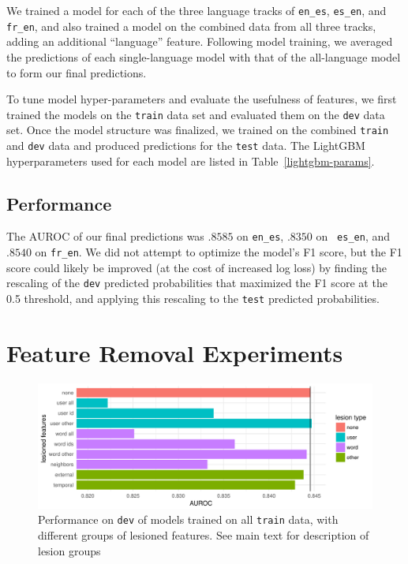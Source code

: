 \documentclass[11pt,a4paper]{article}
\begin{document}
We trained a model for each of the three language tracks of {\tt en\_es}, {\tt es\_en},
and {\tt fr\_en}, and also trained a model on the combined data from
all three tracks, adding an additional ``language'' feature. Following model
training, we averaged the predictions of each single-language model with that of
the all-language model to form our final predictions.

To tune model hyper-parameters and evaluate the usefulness of features, we first
trained the models on the {\tt train} data set and evaluated them on the {\tt dev}
data set. Once the model structure was finalized, we trained on the combined
{\tt train} and {\tt dev} data and produced predictions for the {\tt test} data. The
LightGBM hyperparameters used for each model are listed in Table~\ref{lightgbm-params}.



\subsection{Performance}

The AUROC of our final predictions was $.8585$ on {\tt en\_es}, $.8350$ on {\tt
  es\_en}, and $.8540$ on {\tt fr\_en}. We did not attempt to optimize the model's
F1 score, but the F1 score could likely be improved (at the cost of
increased log loss) by finding the
rescaling of the {\tt dev} predicted probabilities that maximized the F1 score at
the 0.5 threshold, and applying this rescaling to the {\tt test} predicted probabilities.

\section{Feature Removal Experiments}

\begin{figure}[htp]
\includegraphics[width=\textwidth]{lesions.pdf}
\caption{Performance on {\tt dev} of models trained on all {\tt train} data,
  with different groups of lesioned features. See main text for description of
  lesion groups}
\label{fig:lesions}
\end{figure}
\end{document}
